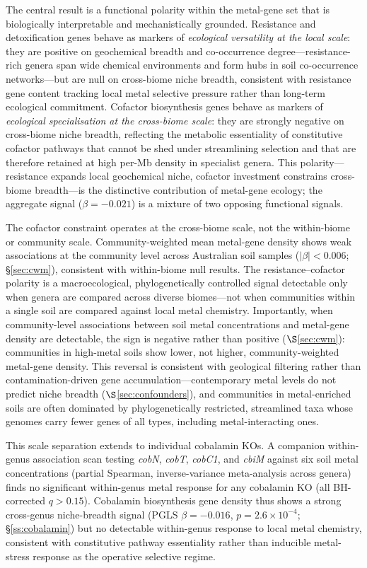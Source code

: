 \documentclass[times]{zHenriquesLab-StyleBioRxiv}
\begin{document}
The central result is a functional polarity within the metal-gene
set that is biologically interpretable and mechanistically grounded. Resistance
and detoxification genes behave as markers of \emph{ecological versatility at
the local scale}: they are positive on geochemical breadth and co-occurrence
degree---resistance-rich genera span wide chemical environments and form hubs in
soil co-occurrence networks---but are null on cross-biome niche breadth,
consistent with resistance gene content tracking local metal selective pressure
rather than long-term ecological commitment. Cofactor biosynthesis genes behave
as markers of \emph{ecological specialisation at the cross-biome scale}: they
are strongly negative on cross-biome niche breadth, reflecting the metabolic
essentiality of constitutive cofactor pathways that cannot be shed under
streamlining selection and that are therefore retained at high per-Mb density
in specialist genera. This polarity---resistance expands local geochemical
niche, cofactor investment constrains cross-biome breadth---is the distinctive
contribution of metal-gene ecology; the aggregate signal ($\beta = -0.021$)
is a mixture of two opposing functional signals.



The cofactor constraint operates at the cross-biome scale, not the within-biome
or community scale. Community-weighted mean metal-gene density shows weak
associations at the community level across Australian soil samples ($|\beta|
< 0.006$; \S\ref{sec:cwm}), consistent with within-biome null results. The
resistance--cofactor polarity is a macroecological, phylogenetically controlled
signal detectable only when genera are compared across diverse biomes---not when
communities within a single soil are compared against local metal chemistry.
Importantly, when community-level associations between soil metal concentrations and metal-gene density are detectable, the sign is negative rather than positive ($\S$\ref{sec:cwm}): communities in high-metal soils show lower, not higher, community-weighted metal-gene density.
This reversal is consistent with geological filtering rather than contamination-driven gene accumulation---contemporary metal levels do not predict niche breadth ($\S$\ref{sec:confounders}), and communities in metal-enriched soils are often dominated by phylogenetically restricted, streamlined taxa whose genomes carry fewer genes of all types, including metal-interacting ones.

This scale separation extends to individual cobalamin KOs. A companion
within-genus association scan testing \textit{cobN}, \textit{cobT},
\textit{cobC1}, and \textit{cbiM} against six soil metal concentrations
(partial Spearman, inverse-variance meta-analysis across genera) finds no
significant within-genus metal response for any cobalamin KO (all
BH-corrected $q > 0.15$). Cobalamin biosynthesis gene density thus shows
a strong cross-genus niche-breadth signal (PGLS $\beta = -0.016$,
$p = 2.6 \times 10^{-4}$; \S\ref{ss:cobalamin}) but no detectable
within-genus response to local metal chemistry, consistent with constitutive
pathway essentiality rather than inducible metal-stress response as the
operative selective regime.
\end{document}
